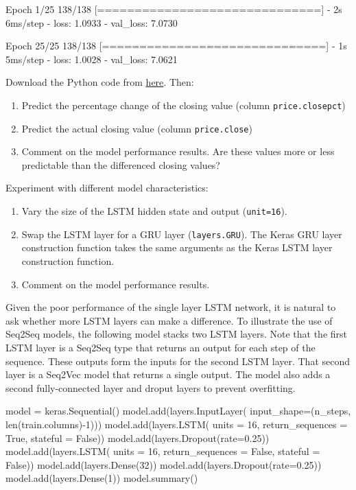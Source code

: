 \begin{withcode}
\begin{textcode}
Epoch 1/25
138/138 [==============================] - 2s 6ms/step -
 loss: 1.0933 - val_loss: 7.0730

Epoch 25/25
138/138 [==============================] - 1s 5ms/step -
 loss: 1.0028 - val_loss: 7.0621
\end{textcode}

\begin{exerciseboxcomputer}

Download the Python code from \href{https://raw.githubusercontent.com/jevermann/busi4720-ml/main/lstm_example.py}{here}. Then:

\begin{enumerate}
   \item Predict the percentage change of the closing value (column \texttt{price.closepct})
   \item Predict the actual closing value (column \texttt{price.close})
   \item Comment on the model performance results. Are these values more or less predictable than the differenced closing values?
\end{enumerate} \vspace{\baselineskip}

Experiment with different model characteristics:
\begin{enumerate}
    \item Vary the size of the LSTM hidden state and output (\texttt{unit=16}).
    \item Swap the LSTM layer for a GRU layer (\texttt{layers.GRU}). The Keras GRU layer construction function takes the same arguments as the Keras LSTM layer construction function.
    \item Comment on the model performance results.
\end{enumerate}
\end{exerciseboxcomputer}

Given the poor performance of the single layer LSTM network, it is natural to ask whether more LSTM layers can make a difference. To illustrate the use of Seq2Seq models, the following model stacks two LSTM layers. Note that the first LSTM layer is a Seq2Seq type that returns an output for each step of the sequence. These outputs form the inputs for the second LSTM layer. That second layer is a Seq2Vec model that returns a single output. The model also adds a second fully-connected layer and droput layers to prevent overfitting. 

\begin{pythoncode}
model = keras.Sequential()
model.add(layers.InputLayer(
    input_shape=(n_steps, len(train.columns)-1)))
model.add(layers.LSTM(
    units = 16, 
    return_sequences = True, 
    stateful = False))
model.add(layers.Dropout(rate=0.25))
model.add(layers.LSTM(
    units = 16, 
    return_sequences = False, 
    stateful = False))
model.add(layers.Dense(32))
model.add(layers.Dropout(rate=0.25))
model.add(layers.Dense(1))
model.summary()
\end{pythoncode}


\end{withcode}
